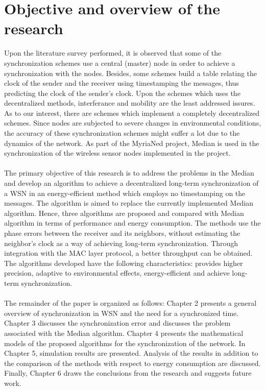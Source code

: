 \documentclass[a4paper,10pt]{report}
\begin{document}
\section{\textbf{Objective and overview of the research}}
Upon the literature survey performed, it is observed that some of
the synchronization schemes use a central (master) node in order to
achieve a synchronization with the nodes.  Besides, some schemes build a table
relating the clock of the sender and the receiver using timestamping
the messages, thus predicting the clock of the sender's clock. Upon the schemes which uses the decentralized methods, interferance and mobility are the least addressed issures. As to our interest, there are schemes which implement a completely decentralized schemes. Since nodes are subjected to severe changes in environmental conditions, the accuracy of these synchronization schemes might suffer a lot due to the dynamics of the network. As part of the MyriaNed project, Median is used in the synchronization of the wireless sensor nodes implemented in the project.
\paragraph*{}
The primary objective of this research is to address the problems in the Median and develop an algorithm to achieve a decentralized long-term synchronization of a WSN in an energy-efficient method which employs no timestamping on the messages. The algorithm is aimed to replace the currently implemented Median algorithm.  Hence, three algorithms are proposed and compared with Median algorithm in terms of performance and energy consumption. The methods use the phase errors between the receiver and its neighbors, without estimating the neighbor's clock as a way of achieving long-term synchronization. Through integration with the MAC layer protocol, a better throughput can be obtained. The algorithms developed have the following characteristics: provides higher precision, adaptive to environmental effects, energy-efficient and achieve long-term synchronization.
\paragraph*{} The remainder of the paper is organized as follows:  Chapter 2 presents a general overview of synchronization in WSN and the need for a synchronized time. Chapter 3 discusses the synchronization error and discusses the problem associated with the Median algorithm. Chapter 4 presents the mathematical models of the proposed algorithms for the synchronization of the network. In Chapter 5, simulation results are presented. Analysis of the results in addition to the comparison of the methods with respect to energy consumption are discussed. Finally, Chapter 6 draws the conclusions from the research and suggests future work.
\end{document}
